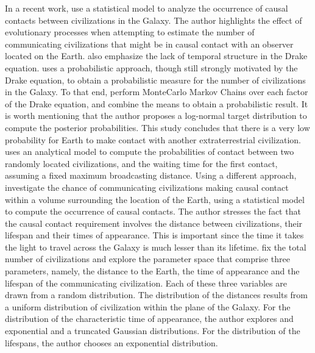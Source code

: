 \documentclass[crop]{CSLB}
\begin{document}
In a recent work, \citep{balbi_impact_2018} use a statistical model to
analyze the occurrence of causal contacts between civilizations in the
Galaxy.
%
The author highlights the effect of evolutionary processes when
attempting to estimate the number of communicating civilizations that
might be in causal contact with an observer located on the Earth.
%
\citet{cirkovic_temporal_2004} also emphasize the lack of temporal
structure in the Drake equation.
%
\citet{bloetscher_using_2019} uses a probabilistic approach, though
still strongly motivated by the Drake equation, to obtain a
probabilistic measure for the number of civilizations in the Galaxy.
%
To that end, perform MonteCarlo Markov Chains over each factor of the
Drake equation, and combine the means to obtain a probabilistic
result.
%
It is worth mentioning that the author proposes a log-normal target
distribution to compute the posterior probabilities.
%
%
This study concludes that there is a very low probability for Earth to
make contact with another extraterrestrial civilization.    
%
\citet{smith_broadcasting_2009} uses an analytical model to compute
the probabilities of contact between two randomly located
civilizations, and the waiting time for the first contact, assuming a
fixed maximum broadcasting distance.
% 
Using a different approach, \citet{balbi_impact_2018} investigate the
chance of communicating civilizations making causal contact within a
volume surrounding the location of the Earth, using a statistical
model to compute the occurrence of causal contacts.
%
The author stresses the fact that the causal contact requirement
involves the distance between civilizations, their lifespan and their
times of appearance.  This is important since the time it takes the
light to travel across the Galaxy is much lesser than its lifetime.
%
\citet{balbi_impact_2018} fix the total number of civilizations and
explore the parameter space that comprise three parameters, namely,
the distance to the Earth, the time of appearance and the lifespan of
the communicating civilization.
%
Each of these three variables are drawn from a random distribution.
The distribution of the distances results from a uniform distribution
of civilization within the plane of the Galaxy.
%
For the distribution of the characteristic time of appearance, the
author explores and exponential and a truncated Gaussian
distributions. For the distribution of the lifespans, the author
chooses an exponential distribution.
%
\end{document}
